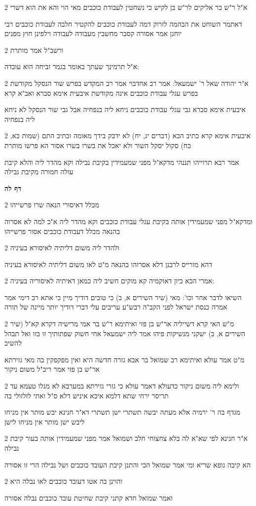 \documentclass[12pt, openany]{book}
\newcommand{\sethebfont}{
\fontsize{10.5pt}{21.0pt} \selectfont
}
\newcommand{\twocol}[1]{
	{\sethebfont \begin{multicols}{2}
			#1
	\end{multicols}}	
}
\newcommand{\sectname}{}
\newcommand{\newsection}[1]{
	\addcontentsline{toc}{section}{#1}
	\renewcommand{\sectname}{#1}	
	\vspace{-\baselineskip}
	\begin{center}
		\textbf{%
\fontsize{16pt}{16pt}\selectfont
			#1}
	\end{center}
	\vspace{-\baselineskip}
	\nopagebreak
}
\begin{document}
\twocol{א"ל ר"ש בר אליקים לר"ש בן לקיש כי נשחטין לעבודת כוכבים מאי הוי והא את הוא דשרי
\par דאתמר השוחט את הבהמה לזרוק דמה לעבודת כוכבים להקטיר חלבה לעבודת כוכבים רבי יוחנן אמר אסורה קסבר מחשבין מעבודה לעבודה וילפינן חוץ מפנים}
\twocol{ורשב"ל אמר מותרת
\par א"ל תרמינך שעתך באומר בגמר זביחה הוא עובדה:}
\twocol{א"ר יהודה שאל ר' ישמעאל: אמר רב אחדבוי אמר רב המקדש בפרש שור הנסקל מקודשת בפרש עגלי עבודת כוכבים אינה מקודשת איבעית אימא סברא ואב"א קרא
\par איבעית אימא סברא גבי עגלי עבודת כוכבים ניחא ליה בנפחיה אבל גבי שור הנסקל לא ניחא ליה בנפחיה}
\twocol{איבעית אימא קרא כתיב הכא (דברים יג, יח) לא ידבק בידך מאומה וכתיב התם (שמות כא, כח) סקול יסקל השור ולא יאכל את בשרו בשרו אסור הא פרשו מותרת
\par אמר רבא תרוייהו תננהי מדקא"ל מפני שמעמידין בקיבת נבילה וקא מהדר ליה והלא קיבת עולה חמורה מקיבת נבילה}
\newsection{דף לה}
\twocol{מכלל דאיסורי הנאה שרו פרשייהו
\par ומדקא"ל מפני שמעמידין אותה בקיבת עגלי עבודת כוכבים וקא מהדר ליה א"כ למה לא אסרוה בהנאה מכלל דעבודת כוכבים אסור פרשייהו}
\twocol{ולהדר ליה משום דליתיה לאיסורא בעיניה
\par דהא מורייס לרבנן דלא אסרוהו בהנאה מ"ט לאו משום דליתיה לאיסורא בעיניה}
\twocol{אמרי הכא כיון דאוקמיה קא מוקים חשיב ליה כמאן דאיתיה לאיסוריה בעיניה:
\par השיאו לדבר אחר וכו': מאי (שיר השירים א, ב) כי טובים דודיך מיין כי אתא רב דימי אמר אמרה כנסת ישראל לפני הקב"ה רבש"ע עריבים עלי דברי דודיך יותר מיינה של תורה}
\twocol{מ"ש האי קרא דשייליה אר"ש בן פזי ואיתימא ר"ש בר אמי מרישיה דקרא קא"ל (שיר השירים א, ב) ישקני מנשיקות פיהו אמר ליה ישמעאל אחי חשוק שפתותיך זו בזו ואל תבהל להשיב
\par מ"ט אמר עולא ואיתימא רב שמואל בר אבא גזרה חדשה היא ואין מפקפקין בה מאי גזירתא אר"ש בן פזי אמר ריב"ל משום ניקור}
\twocol{ולימא ליה משום ניקור כדעולא דאמר עולא כי גזרי גזירתא במערבא לא מגלו טעמא עד תריסר ירחי שתא דלמא איכא איניש דלא ס"ל ואתי לזלזולי בה
\par מגדף בה ר' ירמיה אלא מעתה יבשה תשתרי ישן תשתרי דא"ר חנינא יבש מותר אין מניחו ליבש ישן מותר אין מניחו לישן}
\twocol{א"ר חנינא לפי שא"א לה בלא צחצוחי חלב ושמואל אמר מפני שמעמידין אותה בעור קיבת נבילה
\par הא קיבה גופא שריא ומי אמר שמואל הכי והתנן קיבת העובד כוכבים ושל נבילה הרי זו אסורה}
\twocol{והוינן בה אטו דעובד כוכבים לאו נבלה היא
\par ואמר שמואל חדא קתני קיבת שחיטת עובד כוכבים נבלה אסורה}
\end{document}
